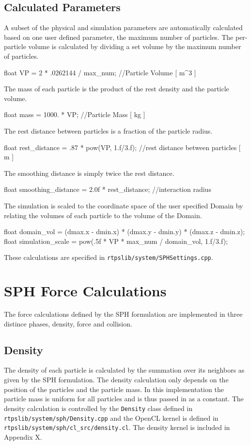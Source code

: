 \subsection{Calculated Parameters}
A subset of the physical and simulation parameters are automatically calculated
based on one user defined parameter, the maximum number of particles. The
per-particle volume is calculated by dividing a set volume by the maximum
number of particles. 
\begin{cppcode}{0}
float VP = 2 * .0262144 / max_num;              //Particle Volume [ m^3 ]
\end{cppcode}

The mass of each particle is the product of the rest density and the particle volume.
\begin{cppcode}{0}
float mass = 1000. * VP;                         //Particle Mass [ kg ]
\end{cppcode}

The rest distance between particles is a fraction of the particle radius.
\begin{cppcode}{0}
float rest_distance = .87 * pow(VP, 1.f/3.f);   //rest distance between particles [ m ]
\end{cppcode}

The smoothing distance is simply twice the rest distance.
\begin{cppcode}{0}
float smoothing_distance = 2.0f * rest_distance; //interaction radius
\end{cppcode}

The simulation is scaled to the coordinate space of the user specified Domain
by relating the volumes of each particle to the volume of the Domain.
\begin{cppcode}{0}
float domain_vol = (dmax.x - dmin.x) * (dmax.y - dmin.y) * (dmax.z - dmin.z);
float simulation_scale = pow(.5f * VP * max_num / domain_vol, 1.f/3.f);
\end{cppcode}

These calculations are specified in \verb|rtpslib/system/SPHSettings.cpp|.


\section{SPH Force Calculations}
The force calculations defined by the SPH formulation are implemented in three
distince phases, density, force and collision.

\subsection{Density}
The density of each particle is calculated by the summation over its neighbors
as given by the SPH formulation. The density calculation only depends on the
position of the particles and the particle mass. In this implementation the
particle mass is uniform for all particles and is thus passed in as a constant.
The density calculation is controlled by the \verb|Density| class defined in
\verb|rtpslib/system/sph/Density.cpp| and the OpenCL kernel is defined in
\verb|rtpslib/system/sph/cl_src/density.cl|. The density kernel is included in
Appendix X.

